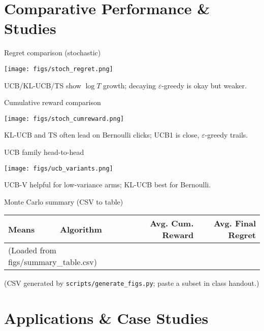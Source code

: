 \documentclass[aspectratio=169]{beamer}
\begin{document}
\section{Comparative Performance \& Studies}

\begin{frame}{Regret comparison (stochastic)}
\begin{center}
\texttt{[image: figs/stoch\_regret.png]}
\end{center}
\small UCB/KL-UCB/TS show $\log T$ growth; decaying $\varepsilon$-greedy is okay but weaker.
\end{frame}

\begin{frame}{Cumulative reward comparison}
\begin{center}
\texttt{[image: figs/stoch\_cumreward.png]}
\end{center}
\small KL-UCB and TS often lead on Bernoulli clicks; UCB1 is close, $\varepsilon$-greedy trails.
\end{frame}

\begin{frame}{UCB family head-to-head}
\begin{center}
\texttt{[image: figs/ucb\_variants.png]}
\end{center}
\small UCB-V helpful for low-variance arms; KL-UCB best for Bernoulli.
\end{frame}

\begin{frame}{Monte Carlo summary (CSV to table)}
\small
\begin{center}
\begin{tabular}{l l r r}
\toprule
Means & Algorithm & Avg. Cum. Reward & Avg. Final Regret\\
\midrule
\multicolumn{2}{l}{(Loaded from figs/summary_table.csv)} & & \\
\bottomrule
\end{tabular}
\end{center}
\small (CSV generated by \texttt{scripts/generate_figs.py}; paste a subset in class handout.)
\end{frame}

\section{Applications \& Case Studies}
\end{document}
